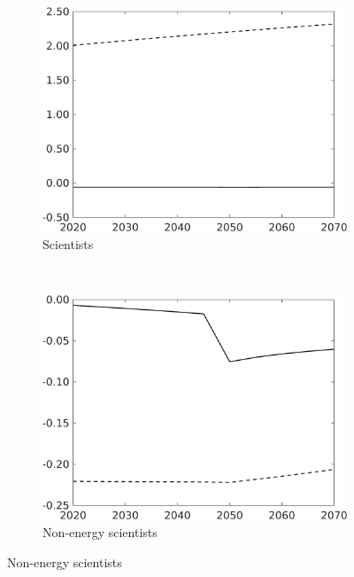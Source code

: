\begin{figure}[h!!!]
\vspace{3mm}
	\begin{subfigure}[]{0.4\textwidth}
		\caption{Scientists}
		\includegraphics[width=1\textwidth]{../../codding_model/own_basedOnFried/optimalPol_010922_revision/figures/all_13Sept22_Tplus30/S_PercentageLFDyn_Target_regime4_knspil0_spillover0_noskill0_sep0_xgrowth0_PV1_etaa0.79_lgd0.png}
	\end{subfigure}
\begin{minipage}[]{0.1\textwidth}
\ 
\end{minipage}
\begin{subfigure}[]{0.4\textwidth}
\caption{Non-energy scientists}
\includegraphics[width=1\textwidth]{../../codding_model/own_basedOnFried/optimalPol_010922_revision/figures/all_13Sept22_Tplus30/snS_PercentageLFDyn_Target_regime4_knspil0_spillover0_noskill0_sep0_xgrowth0_PV1_etaa0.79_lgd0.png}
\end{subfigure}


\end{figure}
